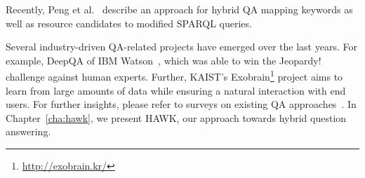 Recently, Peng et al.~\cite{DBLP:journals/corr/PengZZ14} describe an approach for hybrid QA mapping keywords as well as resource candidates to modified SPARQL queries. 




Several industry-driven QA-related projects have emerged over the last years. 
For example, DeepQA of IBM Watson~\cite{watson}, which was able to win the Jeopardy! challenge against human experts. 
Further, {KAIST's Exobrain\footnote{\url{http://exobrain.kr/}}} project aims to learn from large amounts of data while ensuring a natural interaction with end users. 
For further insights, please refer to surveys on existing \ac{QA} approaches~\cite{qasurvey,Kolomiyets:2011,DBLP:journals/semweb/LopezUSM11}.
In Chapter~\ref{cha:hawk}, we present HAWK, our approach towards hybrid question answering. 



